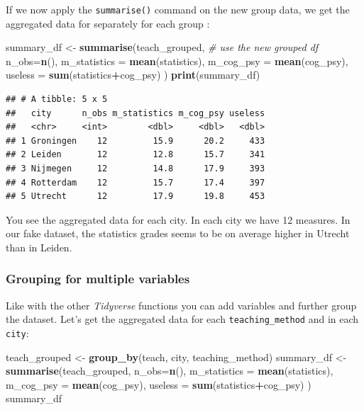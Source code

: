 \documentclass[
]{scrartcl}
\newenvironment{Shaded}{\begin{snugshade}}{\end{snugshade}}
\newcommand{\CommentTok}[1]{\textcolor[rgb]{0.56,0.35,0.01}{\textit{#1}}}
\newcommand{\DataTypeTok}[1]{\textcolor[rgb]{0.13,0.29,0.53}{#1}}
\newcommand{\KeywordTok}[1]{\textcolor[rgb]{0.13,0.29,0.53}{\textbf{#1}}}
\newcommand{\NormalTok}[1]{#1}
\newcommand{\OperatorTok}[1]{\textcolor[rgb]{0.81,0.36,0.00}{\textbf{#1}}}
\newcommand{\StringTok}[1]{\textcolor[rgb]{0.31,0.60,0.02}{#1}}
\begin{document}
If we now apply the \texttt{summarise()} command on the new group data, we get the aggregated data for separately for each group :

\begin{Shaded}
\begin{Highlighting}[]
\NormalTok{summary\_df \textless{}{-}}\StringTok{ }\KeywordTok{summarise}\NormalTok{(teach\_grouped,   }\CommentTok{\# use the new grouped df}
                \DataTypeTok{n\_obs=}\KeywordTok{n}\NormalTok{(),}
                \DataTypeTok{m\_statistics =} \KeywordTok{mean}\NormalTok{(statistics),}
                \DataTypeTok{m\_cog\_psy =} \KeywordTok{mean}\NormalTok{(cog\_psy),}
                \DataTypeTok{useless =} \KeywordTok{sum}\NormalTok{(statistics}\OperatorTok{+}\NormalTok{cog\_psy) )}
\KeywordTok{print}\NormalTok{(summary\_df)}
\end{Highlighting}
\end{Shaded}

\begin{verbatim}
## # A tibble: 5 x 5
##   city      n_obs m_statistics m_cog_psy useless
##   <chr>     <int>        <dbl>     <dbl>   <dbl>
## 1 Groningen    12         15.9      20.2     433
## 2 Leiden       12         12.8      15.7     341
## 3 Nijmegen     12         14.8      17.9     393
## 4 Rotterdam    12         15.7      17.4     397
## 5 Utrecht      12         17.9      19.8     453
\end{verbatim}

You see the aggregated data for each city. In each city we have 12 measures. In our fake dataset, the statistics grades seems to be on average higher in Utrecht than in Leiden.

\hypertarget{grouping-for-multiple-variables}{%
\subsubsection*{Grouping for multiple variables}\label{grouping-for-multiple-variables}}

Like with the other \emph{Tidyverse} functions you can add variables and further group the dataset. Let's get the aggregated data for each \texttt{teaching\_method} and in each \texttt{city}:

\begin{Shaded}
\begin{Highlighting}[]
\NormalTok{teach\_grouped \textless{}{-}}\StringTok{ }\KeywordTok{group\_by}\NormalTok{(teach, city, teaching\_method)}
\NormalTok{summary\_df \textless{}{-}}\StringTok{ }\KeywordTok{summarise}\NormalTok{(teach\_grouped,}
                \DataTypeTok{n\_obs=}\KeywordTok{n}\NormalTok{(),}
                \DataTypeTok{m\_statistics =} \KeywordTok{mean}\NormalTok{(statistics),}
                \DataTypeTok{m\_cog\_psy =} \KeywordTok{mean}\NormalTok{(cog\_psy),}
                \DataTypeTok{useless =} \KeywordTok{sum}\NormalTok{(statistics}\OperatorTok{+}\NormalTok{cog\_psy) )}
\NormalTok{summary\_df}
\end{Highlighting}
\end{Shaded}
\end{document}
